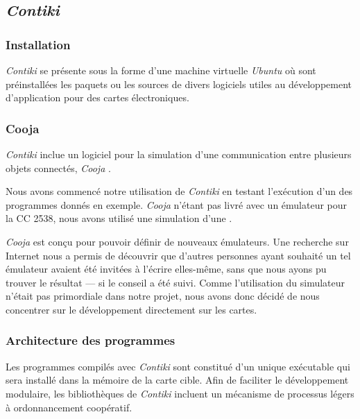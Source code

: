 \subsection{\emph{Contiki}}

\subsubsection{Installation}

\emph{Contiki} se présente sous la forme d’une machine virtuelle \emph{Ubuntu} où sont préinstallées les paquets ou les sources de divers logiciels utiles au développement d’application pour des cartes électroniques.


\subsubsection{Cooja}

\emph{Contiki} inclue un logiciel pour la simulation d’une communication entre plusieurs objets connectés, \emph{Cooja} .

Nous avons commencé notre utilisation de \emph{Contiki} en testant l’exécution d’un des programmes donnés en exemple.
\emph{Cooja} n’étant pas livré avec un émulateur pour la CC 2538, nous avons utilisé une simulation d’une \todo[skymote ?].


\emph{Cooja} est conçu pour pouvoir définir de nouveaux émulateurs.
Une recherche sur Internet nous a permis de découvrir que d’autres personnes ayant souhaité un tel émulateur avaient été invitées à l’écrire elles-même, sans que nous ayons pu trouver le résultat — si le conseil a été suivi.
Comme l’utilisation du simulateur n’était pas primordiale dans notre projet, nous avons donc décidé de nous concentrer sur le développement directement sur les cartes.

\subsubsection{Architecture des programmes}

Les programmes compilés avec \emph{Contiki} sont constitué d’un unique exécutable qui sera installé dans la mémoire de la carte cible.
Afin de faciliter le développement modulaire, les bibliothèques de \emph{Contiki} incluent un mécanisme de processus légers à ordonnancement coopératif.

